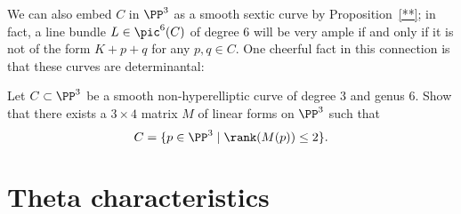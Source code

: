 We can also embed $C$ in $\PP^3$ as a smooth sextic curve by Proposition~\ref{**}; in fact, a line bundle $L \in \pic^6(C)$ of degree 6 will be very ample if and only if it is not of the form $K+p+q$ for any $p, q \in C$. One cheerful fact in this connection is that these curves are determinantal:

\begin{exercise}
Let $C \subset \PP^3$ be a smooth non-hyperelliptic curve of degree 3 and genus 6. Show that there exists a $3 \times 4$ matrix $M$ of linear forms on $\PP^3$ such that 
$$
C = \{ p \in \PP^3 \mid \rank(M(p)) \leq 2 \}.
$$
\end{exercise}

\section{Theta characteristics}




